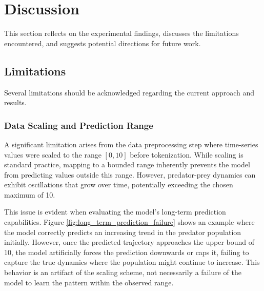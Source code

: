 \documentclass{article}
\begin{document}
\section{Discussion}

This section reflects on the experimental findings, discusses the limitations encountered, and suggests potential directions for future work.

\subsection{Limitations}

Several limitations should be acknowledged regarding the current approach and results.

\subsubsection{Data Scaling and Prediction Range} %
A significant limitation arises from the data preprocessing step where time-series values were scaled to the range $[0, 10]$ before tokenization. While scaling is standard practice, mapping to a bounded range inherently prevents the model from predicting values outside this range. However, predator-prey dynamics can exhibit oscillations that grow over time, potentially exceeding the chosen maximum of 10.

This issue is evident when evaluating the model's long-term prediction capabilities. Figure \ref{fig:long_term_prediction_failure} shows an example where the model correctly predicts an increasing trend in the predator population initially. However, once the predicted trajectory approaches the upper bound of 10, the model artificially forces the prediction downwards or caps it, failing to capture the true dynamics where the population might continue to increase. This behavior is an artifact of the scaling scheme, not necessarily a failure of the model to learn the pattern within the observed range.
\end{document}
